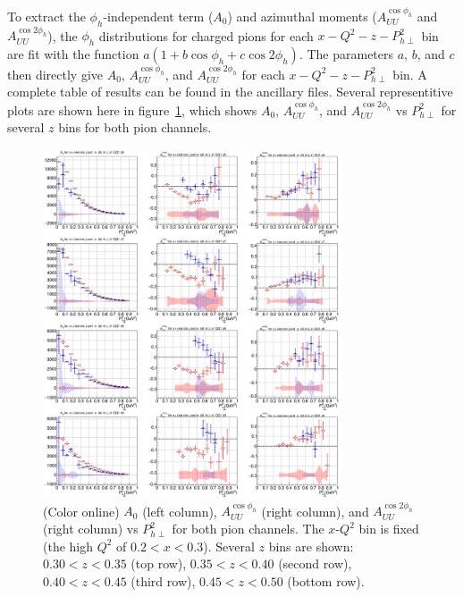 \documentclass[aps,prl,twocolumn,showpacs,superscriptaddress,groupedaddress]{revtex4-1}  %
\begin{document}
To extract the $\phi_h$-independent term ($A_0$) and azimuthal moments ($A_{UU}^{\cos\phi_h}$ and $A_{UU}^{\cos 2\phi_h}$), the $\phi_h$ distributions for charged pions for each $x-Q^2-z-P_{h\perp}^2$ bin are fit with the function $a(1 + b\cos\phi_h + c\cos 2\phi_h)$.
The parameters $a$, $b$, and $c$ then directly give $A_0$, $A_{UU}^{\cos\phi_h}$, and $A_{UU}^{\cos 2\phi_h}$ for each $x-Q^2-z-P_{h\perp}^2$ bin.
A complete table of results can be found in the ancillary files.
Several representitive plots are shown here in figure~\ref{fig:A0AcAcc_zPT2bins_x1QQ1_final}, which shows $A_0$, $A_{UU}^{\cos\phi_h}$, and $A_{UU}^{\cos 2\phi_h}$ vs $P_{h\perp}^2$ for several $z$ bins for both pion channels.
%
\begin{figure}[htp]
\centering
\includegraphics[width=3.5in]{plots/A0AcAcc_zPT2bins_x1QQ1_final.png}
\caption{(Color online) $A_0$ (left column), $A_{UU}^{\cos\phi_h}$ (right column), and $A_{UU}^{\cos 2\phi_h}$ (right column) vs $P_{h\perp}^2$ for both pion channels. The $x$-$Q^2$ bin is fixed (the high $Q^2$ of $0.2 < x < 0.3$). Several $z$ bins are shown: $0.30 < z < 0.35$ (top row), $0.35 < z < 0.40$ (second row), $0.40 < z < 0.45$ (third row), $0.45 < z < 0.50$ (bottom row).}
\label{fig:A0AcAcc_zPT2bins_x1QQ1_final}
\end{figure}
\end{document}
